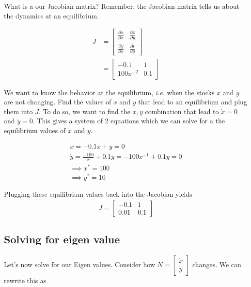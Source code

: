 \documentclass{article}
\begin{document}
What is a our Jacobian matrix? Remember, the Jacobian matrix tells us about the dynamics at an equilibrium. 

\begin{align}
    J &= \begin{bmatrix}
            \frac{\partial \dot x}{\partial x} & \frac{\partial \dot x}{\partial y}\\
            \frac{\partial \dot y}{\partial x} & \frac{\partial \dot t}{\partial y}
    \end{bmatrix}\\
        & = \begin{bmatrix}
            -0.1& 1\\
            100 x ^{-2} & 0.1
    \end{bmatrix}
\end{align}

We want to know the behavior at the equilibrium, \textit{i.e.} when the stocks $x$ and $y$ are not changing. Find the values of $x$ and $y$ that lead to an equilibrium and plug them into $J$. To do so, we want to find the $x,y$ combination that lead to $\dot x = 0$ and $\dot y = 0$. This gives a system of 2 equations which we can solve for a the equilibrium values of $x$ and $y$. 

\begin{align}
    \dot x = -0.1x + y = 0 \\
    \dot y = \frac{-100}{x} + 0.1 y = -100 x^{-1} + 0.1 y = 0\\
    \implies x^* = 100 \\
    \implies y^* = 10
\end{align}

Plugging these equilibrium values back into the Jacobian yields 
\begin{align}
    J = \begin{bmatrix}
            -0.1& 1\\
            0.01 & 0.1
    \end{bmatrix} \label{jacobian}
\end{align}

\subsection{Solving for eigen value}

Let's now solve for our Eigen values. Consider how $\dot N = \begin{bmatrix}
    \dot x\\
    \dot y
\end{bmatrix}$ changes. We can rewrite this as 
\end{document}
